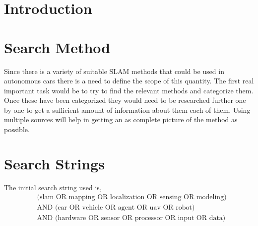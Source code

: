 \documentclass[a4paper, 12pt]{article}
\begin{document}
\section{Introduction}

\section{Search Method}
Since there is a variety of suitable SLAM methods that could be used in
autonomous cars there is a need to define the scope of this quantity. The first
real important task would be to try to find the relevant methods and categorize
them. Once these have been categorized they would need to be researched further
one by one to get a sufficient amount of information about them each of them.
Using multiple sources will help in getting an as complete picture of the
method as possible.

\section{Search Strings}
The initial search string used is,
\begin{align}
    &\text{(slam OR mapping OR localization OR sensing OR modeling)} \nonumber \\ 
    &\text{AND (car OR vehicle OR agent OR uav OR robot)} \\
    &\text{AND (hardware OR sensor OR processor OR input OR data)} \nonumber
\end{align}
\end{document}
